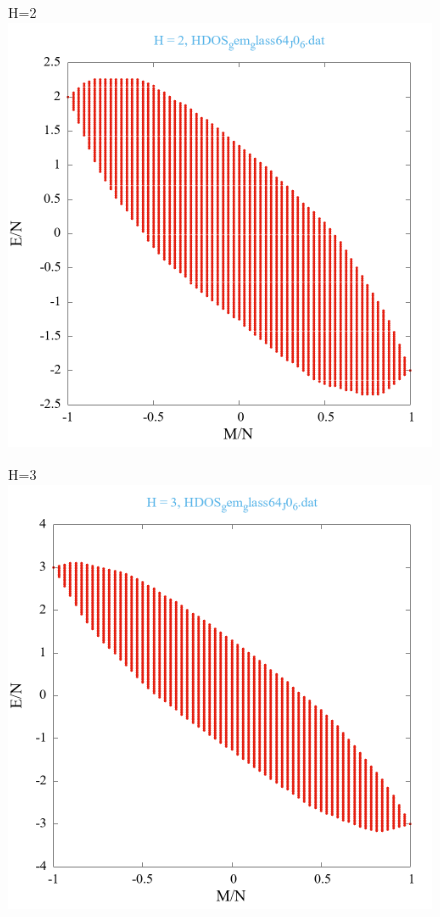 \documentclass[utf8, babel, sor, jor, amsmath, amssymb, reprint]{elsarticle} %
\begin{document}
\begin{figure}[H]
\begin{minipage}[h]{0.45\linewidth}
	\end{minipage}
	\vfill
	\begin{minipage}[h]{0.45\linewidth}
		\centering H=2
		\includegraphics[width=1\linewidth]{pictures/HDOS_gem_glass64_J0_6.dat_H2.png}
	\end{minipage}
	\hfill
	\begin{minipage}[h]{0.45\linewidth}
		\centering H=3
		\includegraphics[width=1\linewidth]{pictures/HDOS_gem_glass64_J0_6.dat_H3.png}

\end{minipage}
\end{figure}
\end{document}
